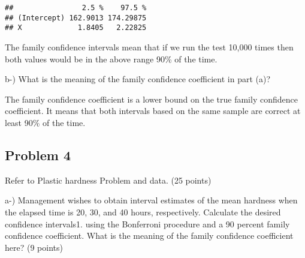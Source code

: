 \documentclass[
]{article}
\newenvironment{Shaded}{\begin{snugshade}}{\end{snugshade}}
\newcommand{\CommentTok}[1]{\textcolor[rgb]{0.56,0.35,0.01}{\textit{#1}}}
\newcommand{\DataTypeTok}[1]{\textcolor[rgb]{0.13,0.29,0.53}{#1}}
\newcommand{\DecValTok}[1]{\textcolor[rgb]{0.00,0.00,0.81}{#1}}
\newcommand{\FloatTok}[1]{\textcolor[rgb]{0.00,0.00,0.81}{#1}}
\newcommand{\KeywordTok}[1]{\textcolor[rgb]{0.13,0.29,0.53}{\textbf{#1}}}
\newcommand{\NormalTok}[1]{#1}
\newcommand{\OperatorTok}[1]{\textcolor[rgb]{0.81,0.36,0.00}{\textbf{#1}}}
\newcommand{\OtherTok}[1]{\textcolor[rgb]{0.56,0.35,0.01}{#1}}
\newcommand{\StringTok}[1]{\textcolor[rgb]{0.31,0.60,0.02}{#1}}
\begin{document}
\begin{Shaded}
\end{Shaded}

\begin{verbatim}
##                2.5 %    97.5 %
## (Intercept) 162.9013 174.29875
## X             1.8405   2.22825
\end{verbatim}

The family confidence intervals mean that if we run the test 10,000
times then both values would be in the above range 90\% of the time.

b-) What is the meaning of the family confidence coefficient in part
(a)?

The family confidence coefficient is a lower bound on the true family
confidence coefficient. It means that both intervals based on the same
sample are correct at least 90\% of the time.

\hypertarget{problem-4}{%
\subsection{Problem 4}\label{problem-4}}

Refer to Plastic hardness Problem and data. (25 points)

a-) Management wishes to obtain interval estimates of the mean hardness
when the elapsed time is 20, 30, and 40 hours, respectively. Calculate
the desired confidence intervals1. using the Bonferroni procedure and a
90 percent family confidence coefficient. What is the meaning of the
family confidence coefficient here? (9 points)

\begin{Shaded}
\end{Shaded}
\end{document}
